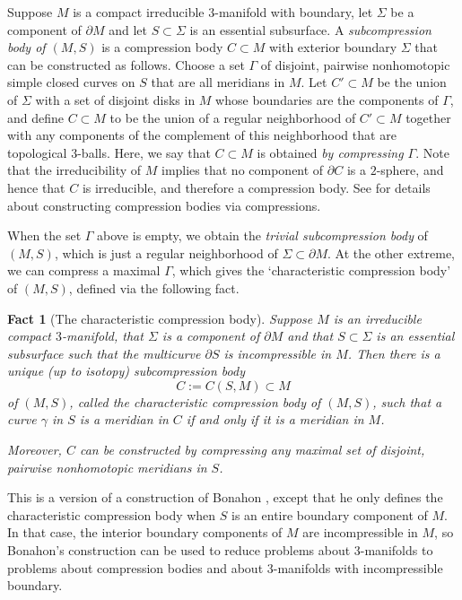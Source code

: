 \documentclass[12pt]{amsart}
\newtheorem{fact}[theorem]{Fact}
\theoremstyle{definition}
\theoremstyle{remark}
\begin{document}
Suppose $M$ is a compact irreducible $3$-manifold with boundary, let $\Sigma$ be a component of $\partial M$ and let $S \subset \Sigma$ is an essential subsurface. A \emph{subcompression body of $(M,S)$} is a compression body $C\subset M$ with exterior boundary $\Sigma$ that can be constructed as follows. Choose a set $\Gamma$ of disjoint, pairwise nonhomotopic simple closed curves on $S$ that are all meridians in $M$. Let $C'\subset M$ be the union of $\Sigma$ with a set of disjoint disks in $M$ whose boundaries are the components of $\Gamma$, and define $C\subset M$ to be the union of a regular neighborhood of $C' \subset M$ together with any components of the complement of this neighborhood that are topological $3$-balls. Here, we say that $C\subset M$ is obtained \emph{by compressing $\Gamma$}. Note that the irreducibility of $M$ implies that no component of $\partial C$ is a $2$-sphere, and hence that $C$ is irreducible, and therefore a compression body. See \cite[\S 2]{Biringerautomorphisms}  for details about constructing compression bodies via compressions.


When the set $\Gamma$ above is empty, we obtain the \emph {trivial subcompression body} of $(M,S)$, which is just a regular neighborhood of $\Sigma \subset \partial M$. At the other extreme, we can compress a maximal $\Gamma$, which gives the `characteristic compression body' of $(M,S)$, defined via the following fact. 


\begin{fact}[The characteristic compression body]\label{charcomp}
Suppose $M$  is an  irreducible  compact $3$-manifold, that $\Sigma$ is a component of $\partial M$ and that $S \subset \Sigma$ is an essential subsurface such that the multicurve $\partial S$ is incompressible in $M$. Then  there is a unique (up to isotopy) subcompression body $$C:=C(S,M) \subset M$$ of $(M,S)$, called the \emph {characteristic compression body} of $(M,S)$, such that a curve $\gamma$ in $S$ is a meridian in $C$ if and only if it is a meridian in $M$.

Moreover, $C$ can be constructed by compressing any  maximal set of disjoint, pairwise nonhomotopic meridians in $S$.\end{fact}

This is a version of a construction of Bonahon \cite{Bonahoncobordism}, except that he only defines the characteristic compression body when $S$ is an entire boundary component of $M$. In that case, the interior boundary components of $M$ are incompressible in $M$, so Bonahon's construction can be used to reduce problems about $3$-manifolds to problems about compression bodies and about  $3$-manifolds with incompressible boundary. 
\end{document}
